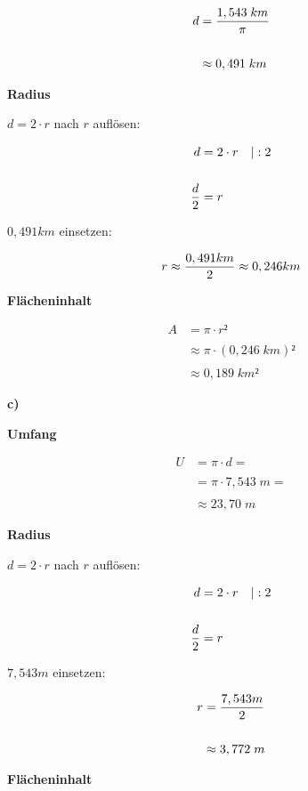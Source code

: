 \documentclass[
  ngerman,
]{book}
\begin{document}
\[\begin{align} d&={1,543\;km \over \pi}\\ 
{}\\
&\approx 0,491\;km \end{align}\]

\textbf{Radius}

\(d = 2 \cdot r\) nach \(r\) auflösen:

\[\begin{align} d &=2 \cdot r \quad |:2\\
{}\\
{d \over 2} &= r
\end{align}\]

\(0,491 km\) einsetzen:

\[r \approx {0,491 km \over 2} \approx 0,246 km\]

\textbf{Flächeninhalt}

\[\begin{align} A &= \pi \cdot r²\\
{}\\
&\approx \pi \cdot (0,246\;km)² \\
{}\\
&\approx 0,189\;km²\end{align}\]

\textbf{c)}

\textbf{Umfang}

\[\begin{align} U &= \pi \cdot d =\\
{}\\
 &= \pi \cdot 7,543\;m =\\
{}\\
&\approx 23,70\;m \end{align}\]

\textbf{Radius}

\(d = 2 \cdot r\) nach \(r\) auflösen:

\[\begin{align} d &=2 \cdot r \quad |:2\\
{}\\
{d \over 2} &= r
\end{align}\]

\(7,543 m\) einsetzen:

\[\begin{align} r &= {7,543 m \over 2} \\
{}\\
&\approx 3,772\;m \end{align}\]

\textbf{Flächeninhalt}
\end{document}
